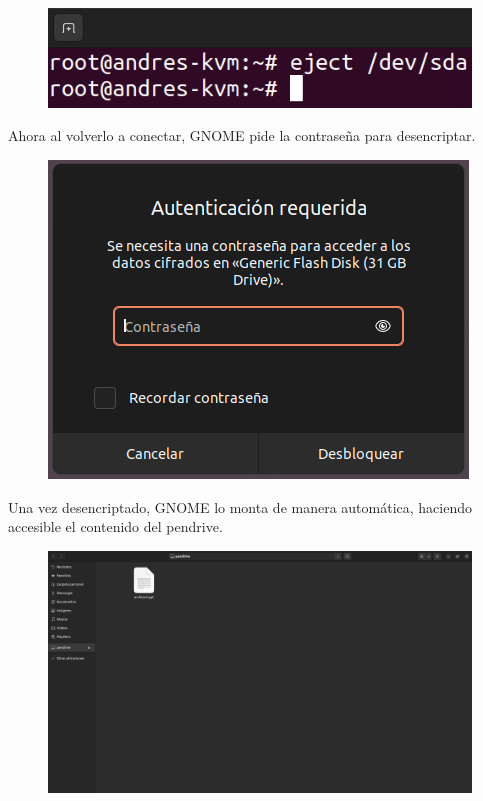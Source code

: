 \documentclass{article}
\begin{document}
\begin{figure}[H]
    \includegraphics[width=\textwidth]{imagenes/Captura desde 2022-10-30 11-03-16.png}
\end{figure}

Ahora al volverlo a conectar, GNOME pide la contraseña para desencriptar.

\begin{figure}[H]
    \includegraphics[width=\textwidth]{imagenes/Captura desde 2022-10-30 11-04-17.png}
\end{figure}

Una vez desencriptado, GNOME lo monta de manera automática, haciendo accesible el contenido del pendrive.

\begin{figure}[H]
    \includegraphics[width=\textwidth]{imagenes/Captura desde 2022-10-30 11-05-16.png}
\end{figure}
\end{document}
